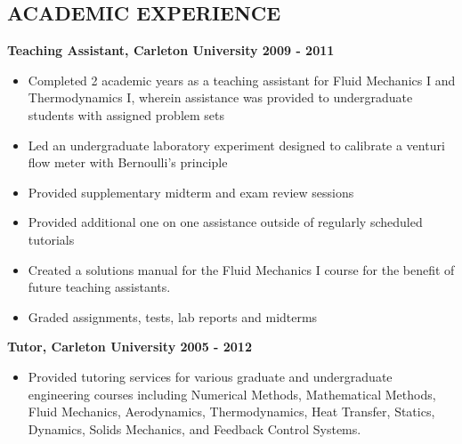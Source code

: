 \documentclass[letterpaper]{res}
\begin{document}
\begin{resume}
\section{ACADEMIC EXPERIENCE}
\vspace{10pt}
{\bf Teaching Assistant, Carleton University \hfill 2009 - 2011}
\begin{itemize} \itemsep -2pt
\item Completed 2 academic years as a teaching assistant for Fluid Mechanics I and Thermodynamics I, wherein assistance was provided to undergraduate students with assigned problem sets
\item Led an undergraduate laboratory experiment designed to calibrate a venturi flow meter with Bernoulli's principle
\item Provided supplementary midterm and exam review sessions
\item Provided additional one on one assistance outside of regularly scheduled tutorials
\item Created a solutions manual for the Fluid Mechanics I course for the benefit of future teaching assistants.
\item Graded assignments, tests, lab reports and midterms
\end{itemize}

{\bf Tutor, Carleton University \hfill 2005 - 2012}
\begin{itemize} \itemsep -2pt
\item Provided tutoring services for various graduate and undergraduate engineering courses including Numerical Methods, Mathematical Methods, Fluid Mechanics, Aerodynamics, Thermodynamics, Heat Transfer, Statics, Dynamics, Solids Mechanics, and Feedback Control Systems.
\end{itemize}



\end{resume}
\end{document}
